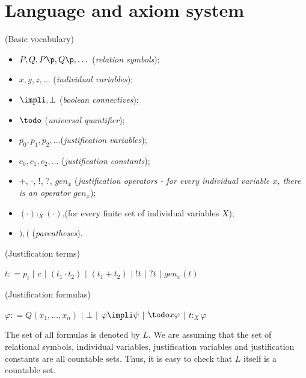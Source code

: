 \section{Language and axiom system}

\begin{defn} (Basic vocabulary)

	\begin{itemize} 
		\item $P, Q, P\p, Q\p, \dots$ (\textit{relation symbols});
		\item $x, y, z, \dots$ (\textit{individual variables});
		\item $\impli, \bot$ (\textit{boolean connectives});
		\item $\todo$ (\textit{universal quantifier});
		\item $p_{0}, p_{1}, p_{2}, \dots$(\textit{justification variables});
		\item $c_{0}, c_{1}, c_{2}, \dots$ (\textit{justification constants});
		\item $+$, $\cdot$, $!$, $?$, $gen_{x}$ (\textit{justification operators - for every individual variable $x$, there is an operator $gen_{x}$});
		\item $(\cdot):_{X} (\cdot)$,(for every finite set of individual variables $X$);
		\item $),($ (\textit{parentheses}).
	\end{itemize}
\end{defn}

\begin{defn} (Justification terms)
\begin{center}
$ t : = p_{i}$   $|$ $c$ $|$  $(t_{1} \cdot t_{2})$ $|$ $(t_{1} + t_{2})$ $|$  $!t$ $|$ $?t$ $|$ $gen_{x}(t)$
\end{center}
\end{defn}

\begin{defn} (Justification formulas)
\begin{center}
$ \varphi : = Q(x_1, \dots, x_n)$   $|$ $\bot$ $|$  $\varphi \impli \psi$ $|$ $\todo x \varphi$ $|$  $t$$:_{X}$$\varphi$
\end{center}
\end{defn}


\qquad The set of all formulas is denoted by $L$. We are assuming that the set of relational symbols, individual variables, justification variables and justification constants are all countable sets. Thus, it is easy to check that $L$ itself is a countable set. 

